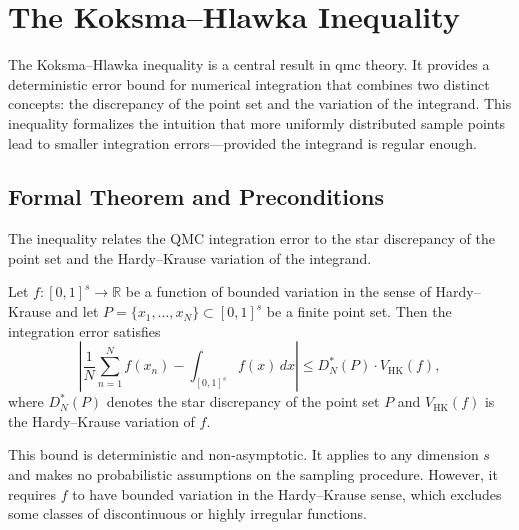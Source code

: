 \section{The Koksma--Hlawka Inequality}

The Koksma--Hlawka inequality is a central result in \acl{qmc} theory. It provides a deterministic error bound for numerical integration that combines two distinct concepts: the discrepancy of the point set and the variation of the integrand. This inequality formalizes the intuition that more uniformly distributed sample points lead to smaller integration errors—provided the integrand is regular enough.

\subsection{Formal Theorem and Preconditions}

The inequality relates the QMC integration error to the star discrepancy of the point set and the Hardy--Krause variation of the integrand.

\begin{theorem}
Let $f \colon [0,1]^s \to \mathbb{R}$ be a function of bounded variation in the sense of Hardy--Krause and let $P = \{x_1, \dots, x_N\} \subset [0,1]^s$ be a finite point set. Then the integration error satisfies
\begin{equation}
    \left| \frac{1}{N} \sum_{n=1}^N f(x_n) - \int_{[0,1]^s} f(x) \, dx \right|
    \leq D_N^{*}(P) \cdot V_{\mathrm{HK}}(f),
\end{equation}
where $D_N^{*}(P)$ denotes the star discrepancy of the point set $P$ and $V_{\mathrm{HK}}(f)$ is the Hardy--Krause variation of $f$.
\end{theorem}

\begin{remark}
This bound is deterministic and non-asymptotic. It applies to any dimension $s$ and makes no probabilistic assumptions on the sampling procedure. However, it requires $f$ to have bounded variation in the Hardy--Krause sense, which excludes some classes of discontinuous or highly irregular functions.
\end{remark}

